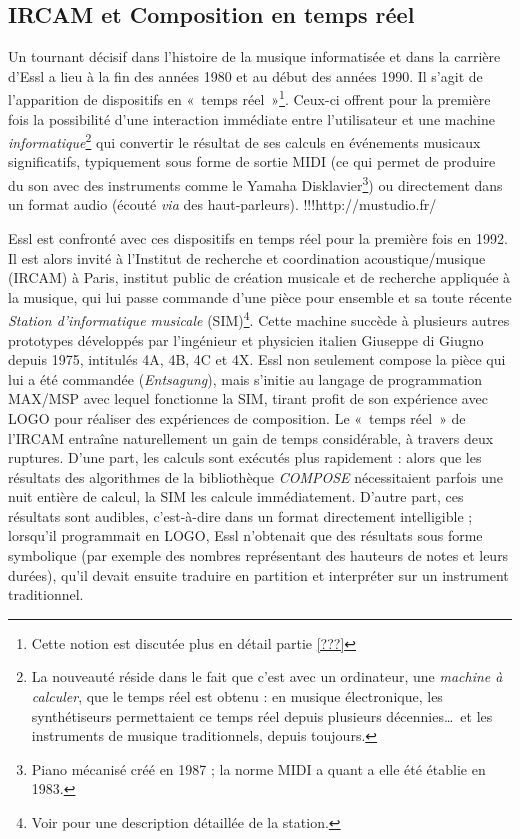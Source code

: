 \documentclass[a4paper,12pt]{article}
\newcommand{\guill}[1]{«~#1~»}
\begin{document}
\subsection{IRCAM et Composition en temps réel}
\label{ircam}

Un tournant décisif dans l'histoire de la musique informatisée et dans la carrière d'Essl a lieu à la fin des années 1980 et au début des années 1990. Il s'agit de l'apparition de dispositifs en \guill{temps réel}\footnote{Cette notion est discutée plus en détail partie \ref{???}}. Ceux-ci offrent pour la première fois la possibilité d'une interaction immédiate entre l'utilisateur et une machine \emph{informatique}\footnote{La nouveauté réside dans le fait que c'est avec un ordinateur, une \emph{machine à calculer}, que le temps réel est obtenu : en musique électronique, les synthétiseurs permettaient ce temps réel depuis plusieurs décennies\dots~et les instruments de musique traditionnels, depuis toujours.} qui convertir le résultat de ses calculs en événements musicaux significatifs, typiquement sous forme de sortie MIDI (ce qui permet de produire du son avec des instruments comme le Yamaha Disklavier\footnote{Piano mécanisé créé en 1987 ; la norme MIDI a quant a elle été établie en 1983.}) ou directement dans un format audio (écouté \emph{via} des haut-parleurs). !!!http://mustudio.fr/

Essl est confronté avec ces dispositifs en temps réel pour la première fois en 1992. Il est alors invité à l'Institut de recherche et coordination acoustique/musique (IRCAM) à Paris, institut public de création musicale et de recherche appliquée à la musique, qui lui passe commande d'une pièce pour ensemble et sa toute récente \emph{Station d'informatique musicale} (SIM)\footnote{Voir \cite{lippe1991ircam} pour une description détaillée de la station.}. Cette machine succède à plusieurs autres prototypes développés par l'ingénieur et physicien italien Giuseppe di Giugno depuis 1975, intitulés 4A, 4B, 4C et 4X. Essl non seulement compose la pièce qui lui a été commandée (\emph{Entsagung}), mais s'initie au langage de programmation MAX/MSP avec lequel fonctionne la SIM, tirant profit de son expérience avec LOGO pour réaliser des expériences de composition. Le \guill{temps réel} de l'IRCAM entraîne naturellement un gain de temps considérable, à travers deux ruptures. D'une part, les calculs sont exécutés plus rapidement : alors que les résultats des algorithmes de la bibliothèque \emph{COMPOSE} nécessitaient parfois une nuit entière de calcul, la SIM les calcule immédiatement. D'autre part, ces résultats sont audibles, c'est-à-dire dans un format directement intelligible ; lorsqu'il programmait en LOGO, Essl n'obtenait que des résultats sous forme symbolique (par exemple des nombres représentant des hauteurs de notes et leurs durées), qu'il devait ensuite traduire en partition et interpréter sur un instrument traditionnel.
\end{document}
